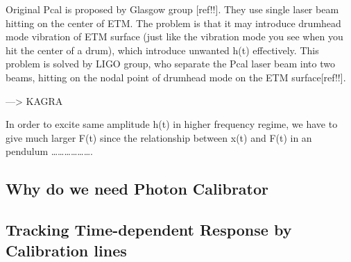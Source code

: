 Original Pcal is proposed by Glasgow group [ref!!]. They use single laser beam hitting on the center of ETM. The problem is that it may introduce drumhead mode vibration of ETM surface (just like the vibration mode you see when you hit the center of a drum), which introduce unwanted h(t) effectively. This problem is solved by LIGO group, who separate the Pcal laser beam into two beams, hitting on the nodal point of drumhead mode on the ETM surface[ref!!].  

 —> KAGRA

In order to excite same amplitude h(t) in higher frequency regime, we have to give much larger F(t) since the relationship between x(t) and F(t) in an pendulum ……………….



\subsection{Why do we need Photon Calibrator}
\subsection{Tracking Time-dependent Response by Calibration lines}
